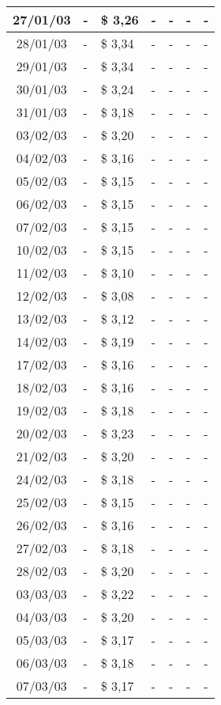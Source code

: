 \begin{center}
\begin{longtable}{|c|p{1.5cm}|p{1.5cm}|p{1.5cm}|p{1.5cm}|p{1.5cm}|p{1.5cm}|}
27/01/03 & - & \$ 3,26 & - & - & - & - \\ \hline
28/01/03 & - & \$ 3,34 & - & - & - & - \\ \hline
29/01/03 & - & \$ 3,34 & - & - & - & - \\ \hline
30/01/03 & - & \$ 3,24 & - & - & - & - \\ \hline
31/01/03 & - & \$ 3,18 & - & - & - & - \\ \hline
03/02/03 & - & \$ 3,20 & - & - & - & - \\ \hline
04/02/03 & - & \$ 3,16 & - & - & - & - \\ \hline
05/02/03 & - & \$ 3,15 & - & - & - & - \\ \hline
06/02/03 & - & \$ 3,15 & - & - & - & - \\ \hline
07/02/03 & - & \$ 3,15 & - & - & - & - \\ \hline
10/02/03 & - & \$ 3,15 & - & - & - & - \\ \hline
11/02/03 & - & \$ 3,10 & - & - & - & - \\ \hline
12/02/03 & - & \$ 3,08 & - & - & - & - \\ \hline
13/02/03 & - & \$ 3,12 & - & - & - & - \\ \hline
14/02/03 & - & \$ 3,19 & - & - & - & - \\ \hline
17/02/03 & - & \$ 3,16 & - & - & - & - \\ \hline
18/02/03 & - & \$ 3,16 & - & - & - & - \\ \hline
19/02/03 & - & \$ 3,18 & - & - & - & - \\ \hline
20/02/03 & - & \$ 3,23 & - & - & - & - \\ \hline
21/02/03 & - & \$ 3,20 & - & - & - & - \\ \hline
24/02/03 & - & \$ 3,18 & - & - & - & - \\ \hline
25/02/03 & - & \$ 3,15 & - & - & - & - \\ \hline
26/02/03 & - & \$ 3,16 & - & - & - & - \\ \hline
27/02/03 & - & \$ 3,18 & - & - & - & - \\ \hline
28/02/03 & - & \$ 3,20 & - & - & - & - \\ \hline
03/03/03 & - & \$ 3,22 & - & - & - & - \\ \hline
04/03/03 & - & \$ 3,20 & - & - & - & - \\ \hline
05/03/03 & - & \$ 3,17 & - & - & - & - \\ \hline
06/03/03 & - & \$ 3,18 & - & - & - & - \\ \hline
07/03/03 & - & \$ 3,17 & - & - & - & - \\ \hline

\end{longtable}
\end{center}
